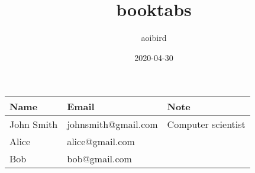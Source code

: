 \documentclass{article}
\title{booktabs}
\author{aoibird}
\date{2020-04-30}
\begin{document}
\maketitle

\begin{tabular}{lll}
  \toprule
  Name & Email & Note \\
  \midrule
  John Smith & johnsmith@gmail.com & Computer scientist \\
  Alice & alice@gmail.com & \\
  Bob & bob@gmail.com & \\
  \bottomrule
\end{tabular}
\end{document}
